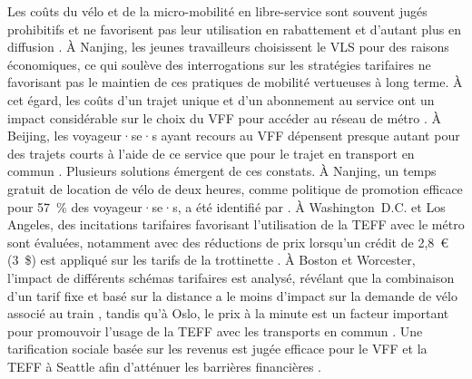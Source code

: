 \begin{refsegment}
Les coûts du vélo et de la micro-mobilité en libre-service sont souvent jugés prohibitifs et ne favorisent pas leur utilisation en rabattement et d'autant plus en diffusion \textcolor{blue}{\autocite[5]{montes_shared_2023}}. À Nanjing, les jeunes travailleurs choisissent le \acrshort{VLS} pour des raisons économiques, ce qui soulève des interrogations sur les stratégies tarifaires ne favorisant pas le maintien de ces pratiques de mobilité vertueuses à long terme. À cet égard, les coûts d'un trajet unique et d'un abonnement au service ont un impact considérable sur le choix du \acrshort{VFF} pour accéder au réseau de métro \textcolor{blue}{\autocite[17]{zhong_layout_2021}}. À Beijing, les voyageur·se·s ayant recours au \acrshort{VFF} dépensent presque autant pour des trajets courts à l'aide de ce service que pour le trajet en transport en commun \textcolor{blue}{\autocite[12]{fan_how_2019}}. Plusieurs solutions émergent de ces constats. À Nanjing, un temps gratuit de location de vélo de deux heures, comme politique de promotion efficace pour 57~\% des voyageur·se·s, a été identifié par \textcolor{blue}{\textcite[135]{chen_determinants_2012}}. À Washington~D.C. et Los Angeles, des incitations tarifaires favorisant l'utilisation de la \acrshort{TEFF} avec le métro sont évaluées, notamment avec des réductions de prix lorsqu'un crédit de 2,8~\euro~ (3~\$) est appliqué sur les tarifs de la trottinette \textcolor{blue}{\autocite[11]{yan_evaluating_2023}}. À Boston et Worcester, l'impact de différents schémas tarifaires est analysé, révélant que la combinaison d'un tarif fixe et basé sur la distance a le moins d'impact sur la demande de vélo associé au train \textcolor{blue}{\autocite[16]{fournier_continuous_2021}}, tandis qu'à Oslo, le prix à la minute est un facteur important pour promouvoir l'usage de la \acrshort{TEFF} avec les transports en commun \textcolor{blue}{\autocite[5]{fearnley_patterns_2020}}. Une tarification sociale basée sur les revenus est jugée efficace pour le \acrshort{VFF} et la \acrshort{TEFF} à Seattle afin d'atténuer les barrières financières \textcolor{blue}{\autocite[975-977]{beale_integrating_2023}}.%


\end{refsegment}
